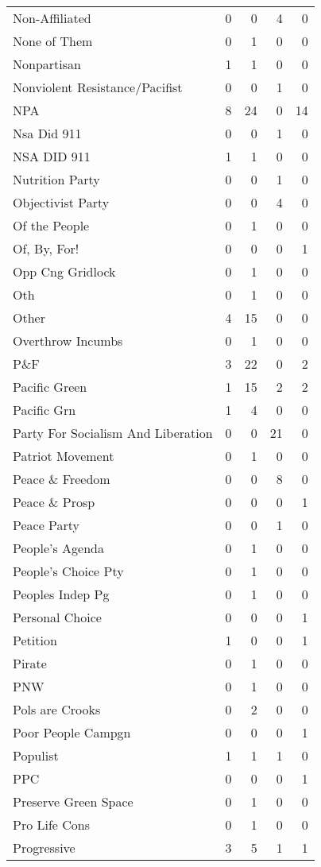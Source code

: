 \begin{supertabular}{lrrrr}
Non-Affiliated & 0 & 0 & 4 & 0\\
None of Them & 0 & 1 & 0 & 0\\
Nonpartisan & 1 & 1 & 0 & 0\\
Nonviolent Resistance/Pacifist & 0 & 0 & 1 & 0\\
NPA & 8 & 24 & 0 & 14\\
Nsa Did 911 & 0 & 0 & 1 & 0\\
NSA DID 911 & 1 & 1 & 0 & 0\\
Nutrition Party & 0 & 0 & 1 & 0\\
Objectivist Party & 0 & 0 & 4 & 0\\
Of the People & 0 & 1 & 0 & 0\\
Of, By, For! & 0 & 0 & 0 & 1\\
Opp Cng Gridlock & 0 & 1 & 0 & 0\\
Oth & 0 & 1 & 0 & 0\\
Other & 4 & 15 & 0 & 0\\
Overthrow Incumbs & 0 & 1 & 0 & 0\\
P\&F & 3 & 22 & 0 & 2\\
Pacific Green & 1 & 15 & 2 & 2\\
Pacific Grn & 1 & 4 & 0 & 0\\
Party For Socialism And Liberation & 0 & 0 & 21 & 0\\
Patriot Movement & 0 & 1 & 0 & 0\\
Peace \& Freedom & 0 & 0 & 8 & 0\\
Peace \& Prosp & 0 & 0 & 0 & 1\\
Peace Party & 0 & 0 & 1 & 0\\
People's Agenda & 0 & 1 & 0 & 0\\
People's Choice Pty & 0 & 1 & 0 & 0\\
Peoples Indep Pg & 0 & 1 & 0 & 0\\
Personal Choice & 0 & 0 & 0 & 1\\
Petition & 1 & 0 & 0 & 1\\
Pirate & 0 & 1 & 0 & 0\\
PNW & 0 & 1 & 0 & 0\\
Pols are Crooks & 0 & 2 & 0 & 0\\
Poor People Campgn & 0 & 0 & 0 & 1\\
Populist & 1 & 1 & 1 & 0\\
PPC & 0 & 0 & 0 & 1\\
Preserve Green Space & 0 & 1 & 0 & 0\\
Pro Life Cons & 0 & 1 & 0 & 0\\
Progressive & 3 & 5 & 1 & 1\\

\end{supertabular}
